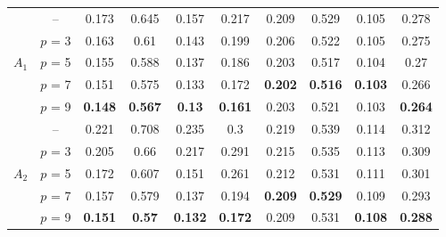 \begin{table}[h]
\begin{tabular}{rrcrrrcrrr}
    \midrule
    
    \multicolumn{1}{l}{\multirow{5}[2]{*}{$A_1$}} & \multicolumn{1}{c}{--} & 0.173 & \multicolumn{1}{c}{0.645} & \multicolumn{1}{c}{0.157} & \multicolumn{1}{c}{0.217} & 0.209 & \multicolumn{1}{c}{0.529} & \multicolumn{1}{c}{0.105} & \multicolumn{1}{c}{0.278} \\
    \multicolumn{1}{l}{} & \multicolumn{1}{l}{$p$ = 3} & 0.163 & \multicolumn{1}{c}{0.61} & \multicolumn{1}{c}{0.143} & \multicolumn{1}{c}{0.199} & 0.206 & \multicolumn{1}{c}{0.522} & \multicolumn{1}{c}{0.105} & \multicolumn{1}{c}{0.275} \\
    \multicolumn{1}{l}{} & \multicolumn{1}{l}{$p$ = 5} & 0.155 & \multicolumn{1}{c}{0.588} & \multicolumn{1}{c}{0.137} & \multicolumn{1}{c}{0.186} & 0.203 & \multicolumn{1}{c}{0.517} & \multicolumn{1}{c}{0.104} & \multicolumn{1}{c}{0.27} \\
    \multicolumn{1}{l}{} & \multicolumn{1}{l}{$p$ = 7} & 0.151 & \multicolumn{1}{c}{0.575} & \multicolumn{1}{c}{0.133} & \multicolumn{1}{c}{0.172} & \textbf{0.202} & \multicolumn{1}{c}{\textbf{0.516}} & \multicolumn{1}{c}{\textbf{0.103}} & \multicolumn{1}{c}{0.266} \\
    \multicolumn{1}{l}{} & \multicolumn{1}{l}{$p$ = 9} & \textbf{0.148} & \multicolumn{1}{c}{\textbf{0.567}} & \multicolumn{1}{c}{\textbf{0.13}} & \multicolumn{1}{c}{\textbf{0.161}} & 0.203 & \multicolumn{1}{c}{0.521} & \multicolumn{1}{c}{0.103} & \multicolumn{1}{c}{\textbf{0.264}} \\
    
    \midrule
    
    \multicolumn{1}{l}{\multirow{5}[2]{*}{$A_2$}} & \multicolumn{1}{c}{--} & 0.221 & \multicolumn{1}{c}{0.708} & \multicolumn{1}{c}{0.235} & \multicolumn{1}{c}{0.3} & 0.219 & \multicolumn{1}{c}{0.539} & \multicolumn{1}{c}{0.114} & \multicolumn{1}{c}{0.312} \\
    \multicolumn{1}{l}{} & \multicolumn{1}{l}{$p$ = 3} & 0.205 & \multicolumn{1}{c}{0.66} & \multicolumn{1}{c}{0.217} & \multicolumn{1}{c}{0.291} & 0.215 & \multicolumn{1}{c}{0.535} & \multicolumn{1}{c}{0.113} & \multicolumn{1}{c}{0.309} \\
    \multicolumn{1}{l}{} & \multicolumn{1}{l}{$p$ = 5} & 0.172 & \multicolumn{1}{c}{0.607} & \multicolumn{1}{c}{0.151} & \multicolumn{1}{c}{0.261} & 0.212 & \multicolumn{1}{c}{0.531} & \multicolumn{1}{c}{0.111} & \multicolumn{1}{c}{0.301} \\
    \multicolumn{1}{l}{} & \multicolumn{1}{l}{$p$ = 7} & 0.157 & \multicolumn{1}{c}{0.579} & \multicolumn{1}{c}{0.137} & \multicolumn{1}{c}{0.194} & \textbf{0.209} & \multicolumn{1}{c}{\textbf{0.529}} & \multicolumn{1}{c}{0.109} & \multicolumn{1}{c}{0.293} \\
    \multicolumn{1}{l}{} & \multicolumn{1}{l}{$p$ = 9} & \textbf{0.151} & \multicolumn{1}{c}{\textbf{0.57}} & \multicolumn{1}{c}{\textbf{0.132}} & \multicolumn{1}{c}{\textbf{0.172}} & 0.209 & \multicolumn{1}{c}{0.531} & \multicolumn{1}{c}{\textbf{0.108}} & \multicolumn{1}{c}{\textbf{0.288}} \\
    

\end{tabular}
\end{table}
